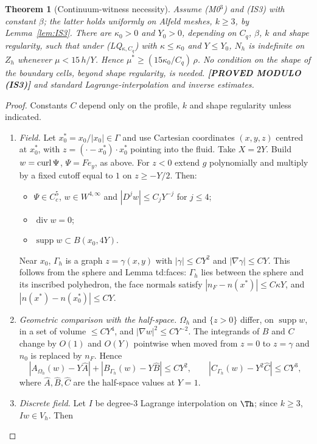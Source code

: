 \documentclass[11pt]{article}
\newtheorem{theorem}{Theorem}\newtheorem{lemma}[theorem]{Lemma}\newtheorem{corollary}[theorem]{Corollary}
\theoremstyle{remark}\newtheorem{remark}[theorem]{Remark}
\newcommand{\Oh}{\Omega_h}\newcommand{\Gh}{\Gamma_h}\newcommand{\hG}{h_\Gamma}\newcommand{\dn}{\partial_n}
\newcommand{\lab}[1]{\textbf{[#1]}}
\begin{document}
\begin{theorem}[Continuum-witness necessity]\label{thm:3B}
Assume (M0$^3$) and (IS3) with constant $\beta$; the latter holds uniformly on Alfeld meshes, $k\ge3$, by Lemma~\ref{lem:IS3}. There are $\kappa_0>0$ and $Y_0>0$, depending on $C_q$, $\beta$, $k$ and shape regularity, such that under (LQ$_{\kappa,C_q}$) with $\kappa\le\kappa_0$ and $Y\le Y_0$, $N_h$ is indefinite on $Z_h$ whenever $\mu<15\,h/Y$. Hence $\mu^\ast\ge(15\kappa_0/C_q)\,\rho$. No condition on the shape of the boundary cells, beyond shape regularity, is needed. \lab{PROVED MODULO (IS3)} and standard Lagrange-interpolation and inverse estimates.
\end{theorem}

\begin{proof}
Constants $C$ depend only on the profile, $k$ and shape regularity unless indicated.
\begin{enumerate}[label=\arabic*.]
\item \emph{Field.} Let $x_0^\ast=x_0/|x_0|\in\Gamma$ and use Cartesian coordinates $(x,y,z)$ centred at $x_0^\ast$, with $z=(\cdot-x_0^\ast)\cdot x_0^\ast$ pointing into the fluid. Take $X=2Y$. Build $w=\operatorname{curl}\Psi$, $\Psi=F e_y$, as above. For $z<0$ extend $g$ polynomially and multiply by a fixed cutoff equal to $1$ on $z\ge-Y/2$. Then:
 \begin{itemize}
 \item $\Psi\in C^5_c$, $w\in W^{4,\infty}$ and $|D^jw|\le C_jY^{-j}$ for $j\le4$;
 \item $\operatorname{div}w=0$;
 \item $\operatorname{supp}w\subset B(x_0,4Y)$.
 \end{itemize}
 Near $x_0$, $\Gh$ is a graph $z=\gamma(x,y)$ with $|\gamma|\le C Y^2$ and $|\nabla\gamma|\le CY$. This follows from the sphere and Lemma td:faces: $\Gh$ lies between the sphere and its inscribed polyhedron, the face normals satisfy $|n_F-n(x^\ast)|\le C\kappa Y$, and $|n(x^\ast)-n(x_0^\ast)|\le CY$.
\item \emph{Geometric comparison with the half-space.} $\Oh$ and $\{z>0\}$ differ, on $\operatorname{supp}w$, in a set of volume $\le CY^4$, and $|\nabla w|^2\le CY^{-2}$. The integrands of $B$ and $C$ change by $O(1)$ and $O(Y)$ pointwise when moved from $z=0$ to $z=\gamma$ and $n_0$ is replaced by $n_F$. Hence
 \[|A_{\Oh}(w)-Y\hat A|+|B_{\Gh}(w)-Y\hat B|\le CY^2,\qquad |C_{\Gh}(w)-Y^2\hat C|\le CY^3,\]
 where $\hat A,\hat B,\hat C$ are the half-space values at $Y=1$.
\item \emph{Discrete field.} Let $I$ be degree-$3$ Lagrange interpolation on $\Th$; since $k\ge3$, $Iw\in V_h$. Then

\end{enumerate}
\end{proof}
\end{document}
